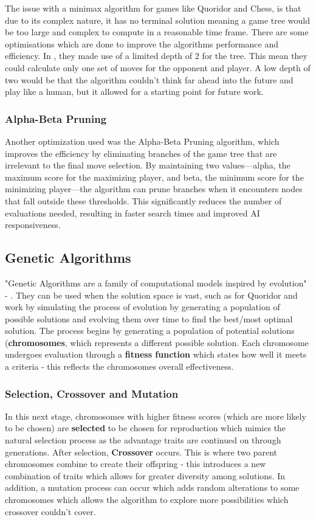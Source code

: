 \documentclass[review]{cmpreport}
\begin{document}
\noindent The issue with a minimax algorithm for games like Quoridor and Chess, is that due to its complex nature, it has no terminal solution meaning a game tree would be too large and complex to compute in a reasonable time frame. There are some optimisations which are done to improve the algorithms performance and efficiency. In \cite{josequoridor}, they made use of a limited depth of 2 for the tree. This mean they could calculate only one set of moves for the opponent and player. A low depth of two would be that the algorithm couldn't think far ahead into the future and play like a human, but it allowed for a starting point for future work. 

\subsubsection{Alpha-Beta Pruning}
Another optimization used was the Alpha-Beta Pruning algorithm, which improves the efficiency by eliminating branches of the game tree that are irrelevant to the final move selection. By maintaining two values—alpha, the maximum score for the maximizing player, and beta, the minimum score for the minimizing player—the algorithm can prune branches when it encounters nodes that fall outside these thresholds. This significantly reduces the number of evaluations needed, resulting in faster search times and improved AI responsiveness.

\subsection{Genetic Algorithms}
"Genetic Algorithms are a family of computational models inspired by evolution" - \cite{mathew2012genetic}. They can be used when the solution space is vast, such as for Quoridor and work by simulating the process of evolution by generating a population of possible solutions and evolving them over time to find the best/most optimal solution. The process begins by generating a population of potential solutions (\textbf{chromosomes}, which represents a different possible solution. Each chromosome undergoes evaluation through a \textbf{fitness function} which states how well it meets a criteria - this reflects the chromosomes overall effectiveness.

\subsubsection{Selection, Crossover and Mutation}
In this next stage, chromosomes with higher fitness scores (which are more likely to be chosen) are \textbf{selected} to be chosen for reproduction which mimics the natural selection process as the advantage traits are continued on through generations. After selection, \textbf{Crossover} occurs. This is where two parent chromosomes combine to create their offspring - this introduces a new combination of traits which allows for greater diversity among solutions. In addition, a mutation process can occur which adds random alterations to some chromosomes which allows the algorithm to explore more possibilities which crossover couldn't cover. \newline
\end{document}
